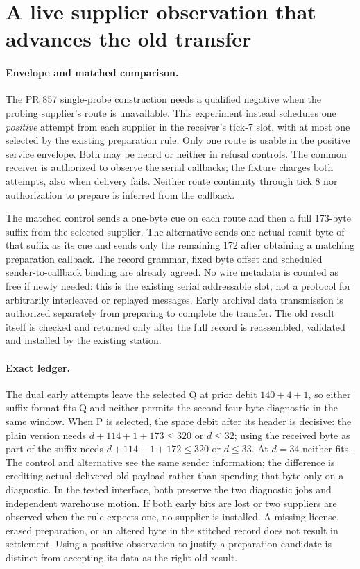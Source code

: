\documentclass{article}
\begin{document}
\section*{A live supplier observation that advances the old transfer}
\paragraph{Envelope and matched comparison.}
The PR 857 single-probe construction needs a qualified negative when
the probing supplier's route is unavailable. This experiment instead
schedules one \emph{positive} attempt from each supplier in the receiver's
tick-7 slot, with at most one selected by the existing preparation rule.
Only one route is usable in the positive service envelope. Both may be
heard or neither in refusal controls. The common receiver is authorized
to observe the serial callbacks; the fixture charges both attempts, also
when delivery fails. Neither route continuity through tick 8 nor
authorization to prepare is inferred from the callback.

The matched control sends a one-byte cue on each route and then a full
173-byte suffix from the selected supplier. The alternative sends one
actual result byte of that suffix as its cue and sends only the remaining
172 after obtaining a matching preparation callback. The record grammar,
fixed byte offset and scheduled sender-to-callback binding are already
agreed. No wire metadata is counted as free if newly needed: this is
the existing serial addressable slot, not a protocol for arbitrarily
interleaved or replayed messages. Early archival data transmission is
authorized separately from preparing to complete the transfer. The
old result itself is checked and returned only after the full record is
reassembled, validated and installed by the existing station.

\paragraph{Exact ledger.}
The dual early attempts leave the selected Q at prior debit
$140+4+1$, so either suffix format fits Q and neither permits
the second four-byte diagnostic in the same window. When P is
selected, the spare debit after its header is decisive: the plain
version needs $d+114+1+173\le320$ or $d\le32$; using the received
byte as part of the suffix needs $d+114+1+172\le320$ or $d\le33$.
At $d=34$ neither fits. The control and alternative see the same
sender information; the difference is crediting actual delivered old
payload rather than spending that byte only on a diagnostic. In the
tested interface, both preserve the two diagnostic jobs and independent
warehouse motion. If both early bits are lost or two suppliers are
observed when the rule expects one, no supplier is installed. A
missing license, erased preparation, or an altered byte in the
stitched record does not result in settlement. Using a positive
observation to justify a preparation candidate is distinct from
accepting its data as the right old result.
\end{document}
